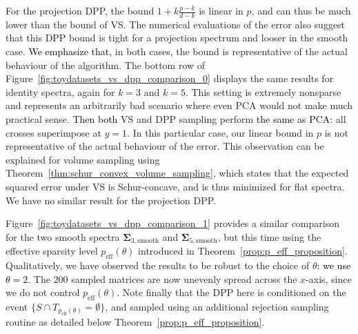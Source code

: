 \documentclass[twoside,11pt]{book}
\newcommand{\rev}[1]{\textcolor{black}{#1}}
\numberwithin{theorem}{chapter}
\numberwithin{definition}{chapter}
\numberwithin{proposition}{chapter}
\numberwithin{corollary}{chapter}
\numberwithin{example}{chapter}
\numberwithin{lemma}{chapter}
\numberwithin{assumption}{chapter}
\numberwithin{equation}{chapter}
\numberwithin{figure}{chapter}
\DeclareMathOperator{\eff}{\mathrm{eff}}
\begin{document}
For the projection DPP, the bound $1+k\frac{p-k}{d-k}$ is linear in $p$, and can thus be much lower than the bound of VS. The numerical evaluations of the error also suggest that this DPP bound is tight for a projection spectrum and looser in the smooth case. \rev{We emphasize that,} in both cases, the bound is representative of the actual behaviour of the algorithm.
The bottom row of Figure~\ref{fig:toydatasets_vs_dpp_comparison_0} displays the same results for identity spectra, again for $k=3$ and $k=5$. This setting is extremely nonsparse and represents an arbitrarily bad scenario where even PCA would not make much practical sense. \rev{Then both} VS and DPP sampling perform \rev{the same as PCA}: all crosses superimpose at $y=1$. In this particular case, our linear bound in $p$ is not representative of the actual behaviour of the error. This observation can be explained for volume sampling using Theorem~\ref{thm:schur_convex_volume_sampling}, which states that the expected squared error under VS is Schur-concave, and is thus minimized for flat spectra. We have no similar result for the projection DPP.

Figure~\ref{fig:toydatasets_vs_dpp_comparison_1} provides a similar comparison for the two smooth spectra $\bm{\Sigma}_{3,\text{smooth}}$ and $\bm{\Sigma}_{5,\text{smooth}}$, but this time using the effective sparsity level $p_{\eff}(\theta)$ introduced in Theorem~\ref{prop:p_eff_proposition}. Qualitatively, we have observed the results to be robust to the choice of $\theta$\rev{: we use $\theta=2$}. The $200$ sampled matrices are now unevenly spread across the $x$-axis, since we do not control $p_{\eff}(\theta)$. Note finally that the DPP here is conditioned on the event $\{S \cap T_{p_{\mathrm{eff}}(\theta)}=\emptyset\}$, and sampled using an additional rejection sampling routine as detailed below Theorem~\ref{prop:p_eff_proposition}.
\end{document}
